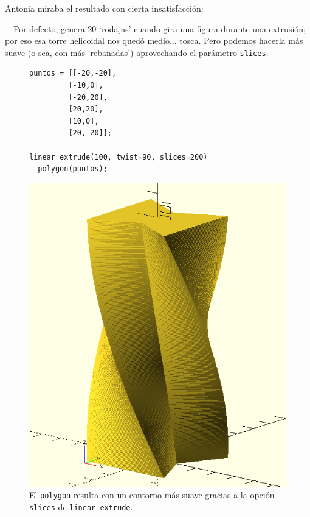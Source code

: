  Antonia miraba el resultado con cierta insatisfacción:

 ---Por defecto, \openscad{} genera 20 `rodajas' cuando gira una
 figura durante una extrusión; por eso esa torre helicoidal nos quedó
 medio... tosca. Pero podemos hacerla más suave (o sea, con más
 `rebanadas') aprovechando el parámetro \lstinline!slices!.

  \begin{figure}[ht]
  \begin{minipage}[]{.6\textwidth}%
    \begin{lstlisting}
puntos = [[-20,-20],
         [-10,0],
         [-20,20],
         [20,20],
         [10,0],
         [20,-20]];

linear_extrude(100, twist=90, slices=200)
  polygon(puntos);
    \end{lstlisting}
  \end{minipage}\hfill
  \begin{minipage}[]{.4\textwidth}%
      \centering
    \includegraphics[width=.95\textwidth]{imagenes/extrusion-slices}
    \end{minipage}
    \caption{El \lstinline!polygon! resulta con un contorno más suave
      gracias a la opción \lstinline!slices! de
      \lstinline!linear_extrude!.}
  \label{fig:extrusion-slices}
  \end{figure}

